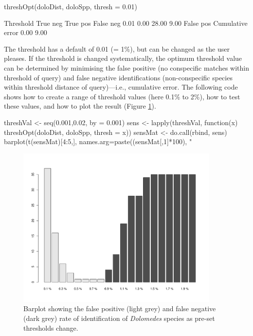 \documentclass{article}
\newcommand{\fun}[1]{\texttt{#1}}
\begin{document}
\begin{console}
threshOpt(doloDist, doloSpp, thresh = 0.01)
\end{console}

\begin{Routput}
       Threshold         True neg         True pos        False neg 
            0.01             0.00            28.00             9.00 
       False pos Cumulative error 
            0.00             9.00
\end{Routput}

The threshold has a default of 0.01 (= 1\%), but can be changed as the user pleases. If the threshold is changed systematically, the optimum threshold value can be determined by minimising the false positive (no conspecific matches within threshold of query) and false negative identifications (non-conspecific species within threshold distance of query)---i.e., cumulative error. The following code shows how to create a range of threshold values (here 0.1\% to 2\%), how to test these values, and how to plot the result (Figure \ref{sensitivity.fig}). %

\begin{console}
threshVal <- seq(0.001,0.02, by = 0.001)
sens <- lapply(threshVal, function(x) threshOpt(doloDist, doloSpp, thresh = x))
sensMat <- do.call(rbind, sens)
barplot(t(sensMat)[4:5,], names.arg=paste((sensMat[,1]*100), "%
\end{console}

\begin{figure}[p]
	\centering
	\includegraphics[width=0.9\textwidth,trim= 3cm 0cm 3cm 0cm]{sensitivity2}
	\caption{Barplot showing the false positive (light grey) and false negative (dark grey) rate of identification of \emph{Dolomedes} species as pre-set thresholds change.}
	\label{sensitivity.fig}
\end{figure}
\end{document}
